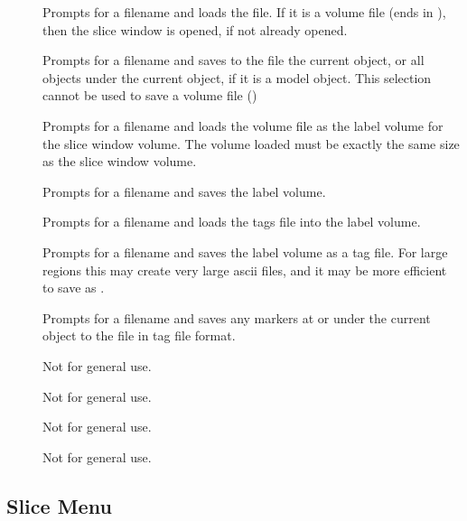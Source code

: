 \begin{description}
\item[]  Prompts for a filename and loads the file.
        If it is a volume file (ends in ), then the
        slice window is opened, if not already opened.
\item[]  Prompts for a filename and saves to the file
        the current object, or all objects under the current object, if it is
        a model object.  This selection cannot be used to save a volume
        file ()
\item[]  Prompts for a filename and
        loads the volume file as the label volume for the slice window
        volume.
        The volume loaded must be exactly the same size as the slice
        window volume.
\item[]  Prompts for a filename and
        saves the label volume.
\item[]  Prompts for a filename and
        loads the tags file into the label volume.
\item[]  Prompts for a filename and
        saves the label volume as a tag file.  For large regions
        this may create very large ascii files, and it may be more
        efficient to save as .
\item[]  Prompts for a filename and
        saves any markers at or under the current object to the file
        in tag file format.

\item[]  Not for general use.
\item[]  Not for general use.
\item[]  Not for general use.
\item[]  Not for general use.
\end{description}

\subsection{Slice Menu}

